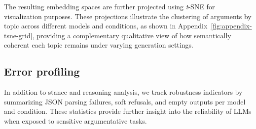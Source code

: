 The resulting embedding spaces are further projected using \textit{t}-SNE for visualization purposes. These projections illustrate the clustering of arguments by topic across different models and conditions, as shown in Appendix~\ref{fig:appendix-tsne-grid}, providing a complementary qualitative view of how semantically coherent each topic remains under varying generation settings.

\subsection*{Error profiling}
In addition to stance and reasoning analysis, we track robustness indicators by summarizing JSON parsing failures, soft refusals, and empty outputs per model and condition. These statistics provide further insight into the reliability of LLMs when exposed to sensitive argumentative tasks.

